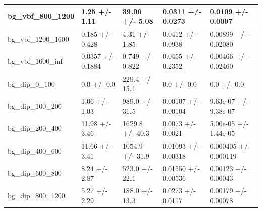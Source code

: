 \documentclass[a4paper, 10pt]{article}
\begin{document}
\begin{table}[H]
\begin{center}
\begin{tabular}{|m{20.0mm}|m{27.0mm}|m{27.0mm}|m{33.0mm}|m{32.0mm}|}
      \hline
      {\cellcolor{white}         bg\_vbf\_800\_1200}& {\cellcolor{white}         1.25 +/\-- 1.11}& {\cellcolor{white}         39.06 +/\-- 5.08}& {\cellcolor{white}         0.0311 +/\-- 0.0273}& {\cellcolor{white}         0.0109 +/\-- 0.0097}\\
      \hline
      {\cellcolor{white}         bg\_vbf\_1200\_1600}& {\cellcolor{white}         0.185 +/\-- 0.428}& {\cellcolor{white}         4.31 +/\-- 1.85}& {\cellcolor{white}         0.0412 +/\-- 0.0938}& {\cellcolor{white}         0.00899 +/\-- 0.02080}\\
      \hline
      {\cellcolor{white}         bg\_vbf\_1600\_inf}& {\cellcolor{white}         0.0357 +/\-- 0.1884}& {\cellcolor{white}         0.749 +/\-- 0.822}& {\cellcolor{white}         0.0455 +/\-- 0.2352}& {\cellcolor{white}         0.00466 +/\-- 0.02460}\\
      \hline
      {\cellcolor{white}         bg\_dip\_0\_100}& {\cellcolor{white}         0.0 +/\-- 0.0}& {\cellcolor{white}         229.4 +/\-- 15.1}& {\cellcolor{white}         0.0 +/\-- 0.0}& {\cellcolor{white}         0.0 +/\-- 0.0}\\
      \hline
      {\cellcolor{white}         bg\_dip\_100\_200}& {\cellcolor{white}         1.06 +/\-- 1.03}& {\cellcolor{white}         989.0 +/\-- 31.5}& {\cellcolor{white}         0.00107 +/\-- 0.00104}& {\cellcolor{white}         9.63e-07 +/\-- 9.38e-07}\\
      \hline
      {\cellcolor{white}         bg\_dip\_200\_400}& {\cellcolor{white}         11.98 +/\-- 3.46}& {\cellcolor{white}         1629.8 +/\-- 40.3}& {\cellcolor{white}         0.0073 +/\-- 0.0021}& {\cellcolor{white}         5.00e-05 +/\-- 1.44e-05}\\
      \hline
      {\cellcolor{white}         bg\_dip\_400\_600}& {\cellcolor{white}         11.66 +/\-- 3.41}& {\cellcolor{white}         1054.9 +/\-- 31.9}& {\cellcolor{white}         0.01093 +/\-- 0.00318}& {\cellcolor{white}         0.000405 +/\-- 0.000119}\\
      \hline
      {\cellcolor{white}         bg\_dip\_600\_800}& {\cellcolor{white}         8.24 +/\-- 2.87}& {\cellcolor{white}         523.0 +/\-- 22.1}& {\cellcolor{white}         0.01550 +/\-- 0.00536}& {\cellcolor{white}         0.00123 +/\-- 0.00043}\\
      \hline
      {\cellcolor{white}         bg\_dip\_800\_1200}& {\cellcolor{white}         5.27 +/\-- 2.29}& {\cellcolor{white}         188.0 +/\-- 13.3}& {\cellcolor{white}         0.0273 +/\-- 0.0117}& {\cellcolor{white}         0.00179 +/\-- 0.00078}\\

\end{tabular}
\end{center}
\end{table}
\end{document}
